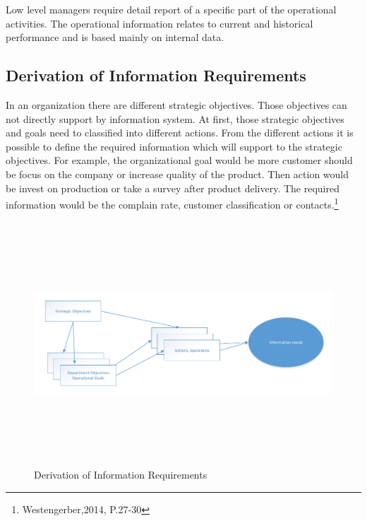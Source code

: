 Low level managers require  detail report of a specific part of the operational activities. The operational information  relates to current and historical performance and is based mainly on internal data.

\subsection{Derivation of Information Requirements}

In an organization there are different strategic objectives. Those objectives can not directly support by information system. At first, those strategic objectives and goals need to classified into different  actions. From the different actions it is possible to define the required information which will support to the strategic objectives. For example, the organizational goal would be more customer should be focus  on the company or increase quality of the product. Then action would be invest on production or take a survey after product delivery. The required information would be the complain rate, customer classification or contacts.\footnote{Westengerber,2014, P.27-30 }  

\begin{figure}[!ht]
	\centering
		\includegraphics[width=845pt, height=258pt, width=1.0\textwidth]{images/info2.pdf}
	\caption[Derivation of Information Requirements]{Derivation of Information Requirements\footnotemark} 
	\label{fig:Info2}

\end{figure}
